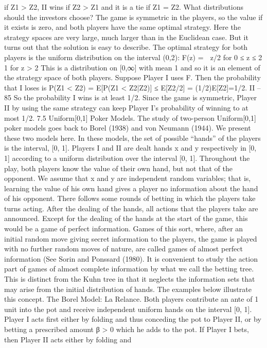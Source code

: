 if Z1 > Z2, II wins if Z2 > Z1 and it is a tie if Z1 = Z2. What distributions should the
investors choose?
The game is symmetric in the players, so the value if it exists is zero, and both players
have the same optimal strategy. Here the strategy spaces are very large, much larger than
in the Euclidean case. But it turns out that the solution is easy to describe. The optimal
strategy for both players is the uniform distribution on the interval (0,2):
F(z) =  z/2 for 0 ≤ z ≤ 2
1 for z > 2
This is a distribution on [0,∞] with mean 1 and so it is an element of the strategy space
of both players. Suppose Player I uses F. Then the probability that I loses is
P(Z1 < Z2) = E[P(Z1 < Z2|Z2)] ≤ E[Z2/2] = (1/2)E[Z2]=1/2.
II – 85
So the probability I wins is at least 1/2. Since the game is symmetric, Player II by using
the same strategy can keep Player I’s probability of winning to at most 1/2.
7.5 Uniform[0,1] Poker Models. The study of two-person Uniform[0,1] poker
models goes back to Borel (1938) and von Neumann (1944). We present these two models
here. In these models, the set of possible “hands” of the players is the interval, [0, 1].
Players I and II are dealt hands x and y respectively in [0, 1] according to a uniform
distribution over the interval [0, 1]. Throughout the play, both players know the value of
their own hand, but not that of the opponent. We assume that x and y are independent
random variables; that is, learning the value of his own hand gives a player no information
about the hand of his opponent.
There follows some rounds of betting in which the players take turns acting. After
the dealing of the hands, all actions that the players take are announced. Except for the
dealing of the hands at the start of the game, this would be a game of perfect information.
Games of this sort, where, after an initial random move giving secret information to the
players, the game is played with no further random moves of nature, are called games of
almost perfect information (See Sorin and Ponssard (1980).
It is convenient to study the action part of games of almost complete information by
what we call the betting tree. This is distinct from the Kuhn tree in that it neglects the
information sets that may arise from the initial distribution of hands. The examples below
illustrate this concept.
The Borel Model: La Relance. Both players contribute an ante of 1 unit into the
pot and receive independent uniform hands on the interval [0, 1]. Player I acts first either
by folding and thus conceding the pot to Player II, or by betting a prescribed amount
β > 0 which he adds to the pot. If Player I bets, then Player II acts either by folding and
